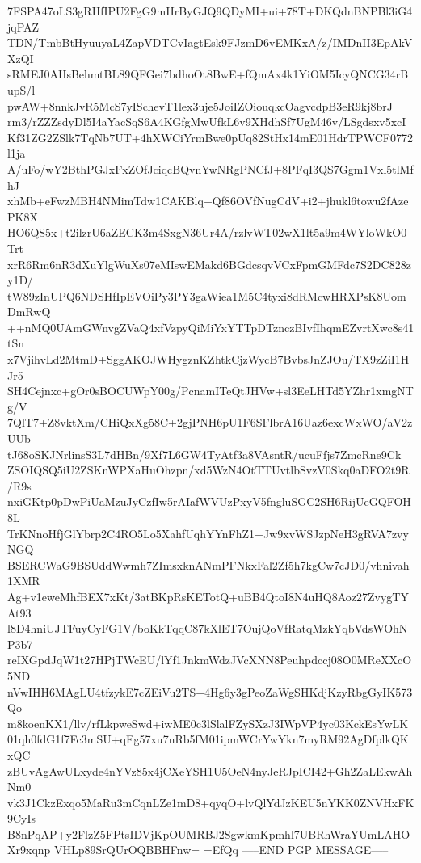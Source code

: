 7FSPA47oLS3gRHfIPU2FgG9mHrByGJQ9QDyMI+ui+78T+DKQdnBNPBl3iG4jqPAZ
TDN/TmbBtHyuuyaL4ZapVDTCvIagtEsk9FJzmD6vEMKxA/z/IMDnII3EpAkVXzQI
sRMEJ0AHsBehmtBL89QFGei7bdhoOt8BwE+fQmAx4k1YiOM5IcyQNCG34rBupS/l
pwAW+8nnkJvR5McS7yISchevT1lex3uje5JoiIZOiouqkcOagvcdpB3eR9kj8brJ
rm3/rZZZsdyDl5I4aYacSqS6A4KGfgMwUfkL6v9XHdhSf7UgM46v/LSgdsxv5xcI
Kf31ZG2ZSlk7TqNb7UT+4hXWCiYrmBwe0pUq82StHx14mE01HdrTPWCF0772l1ja
A/uFo/wY2BthPGJxFxZOfJciqcBQvnYwNRgPNCfJ+8PFqI3QS7Ggm1Vxl5tlMfhJ
xhMb+eFwzMBH4NMimTdw1CAKBlq+Qf86OVfNugCdV+i2+jhukl6towu2fAzePK8X
HO6QS5x+t2ilzrU6aZECK3m4SxgN36Ur4A/rzlvWT02wX1lt5a9m4WYloWkO0Trt
xrR6Rm6nR3dXuYlgWuXs07eMIswEMakd6BGdcsqvVCxFpmGMFdc7S2DC828zy1D/
tW89zInUPQ6NDSHfIpEVOiPy3PY3gaWiea1M5C4tyxi8dRMcwHRXPsK8UomDmRwQ
++nMQ0UAmGWnvgZVaQ4xfVzpyQiMiYxYTTpDTznczBIvfIhqmEZvrtXwc8s41tSn
x7VjihvLd2MtmD+SggAKOJWHygznKZhtkCjzWycB7BvbsJnZJOu/TX9zZiI1HJr5
SH4Cejnxc+gOr0sBOCUWpY00g/PcnamITeQtJHVw+sl3EeLHTd5YZhr1xmgNTg/V
7QlT7+Z8vktXm/CHiQxXg58C+2gjPNH6pU1F6SFlbrA16Uaz6excWxWO/aV2zUUb
tJ68oSKJNrlinsS3L7dHBn/9Xf7L6GW4TyAtf3a8VAsntR/ucuFfjs7ZmcRne9Ck
ZSOIQSQ5iU2ZSKnWPXaHuOhzpn/xd5WzN4OtTTUvtlbSvzV0Skq0aDFO2t9R/R9s
nxiGKtp0pDwPiUaMzuJyCzfIw5rAIafWVUzPxyV5fngluSGC2SH6RijUeGQFOH8L
TrKNnoHfjGlYbrp2C4RO5Lo5XahfUqhYYnFhZ1+Jw9xvWSJzpNeH3gRVA7zvyNGQ
BSERCWaG9BSUddWwmh7ZImsxknANmPFNkxFal2Zf5h7kgCw7cJD0/vhnivah1XMR
Ag+v1eweMhfBEX7xKt/3atBKpRsKETotQ+uBB4QtoI8N4uHQ8Aoz27ZvygTYAt93
l8D4hniUJTFuyCyFG1V/boKkTqqC87kXlET7OujQoVfRatqMzkYqbVdsWOhNP3b7
reIXGpdJqW1t27HPjTWcEU/lYf1JnkmWdzJVcXNN8Peuhpdccj08O0MReXXcO5ND
nVwIHH6MAgLU4tfzykE7cZEiVu2TS+4Hg6y3gPeoZaWgSHKdjKzyRbgGyIK573Qo
m8koenKX1/llv/rfLkpweSwd+iwME0c3lSlalFZySXzJ3IWpVP4yc03KckEsYwLK
01qh0fdG1f7Fc3mSU+qEg57xu7nRb5fM01ipmWCrYwYkn7myRM92AgDfplkQKxQC
zBUvAgAwULxyde4nYVz85x4jCXeYSH1U5OeN4nyJeRJpICI42+Gh2ZaLEkwAhNm0
vk3J1CkzExqo5MaRu3mCqnLZe1mD8+qyqO+lvQlYdJzKEU5nYKK0ZNVHxFK9CyIs
B8nPqAP+y2FlzZ5FPtsIDVjKpOUMRBJ2SgwkmKpmhl7UBRhWraYUmLAHOXr9xqnp
VHLp89SrQUrOQBBHFnw=
=EfQq
-----END PGP MESSAGE-----

